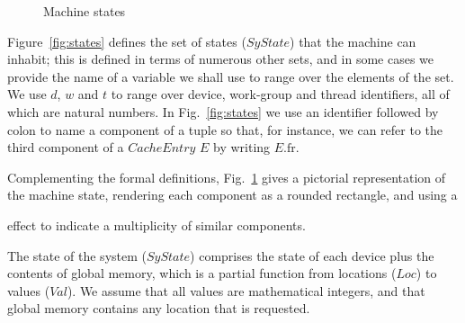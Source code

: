 \documentclass[svgnames,10pt]{sigplanconf}
\theoremstyle{definition}
\newcommand\var[1]{\mathit{#1}}
\begin{document}
\begin{figure}
{
\label{fig:states_pic}
}
\caption{Machine states}
\end{figure}

Figure~\ref{fig:states} defines the set of states ($\var{SyState}$) that
the machine can inhabit; this is defined in terms of numerous other
sets, and in some cases we provide the name of a variable we shall use
to range over the elements of the set. We use $d$, $w$ and $t$ to
range over device, work-group and thread identifiers, all of which are
natural numbers. In Fig.~\ref{fig:states} we use an identifier
followed by colon to name a component of a tuple so that, for
instance, we can refer to the third component of a $\var{CacheEntry}$
$E$ by writing $E.\mathrm{fr}$.

Complementing the formal definitions, Fig.~\ref{fig:states_pic}
gives a pictorial representation of the machine state, rendering each
component as a rounded rectangle, and using a 
effect to indicate a multiplicity of similar components.

The state of the system ($\var{SyState}$) comprises the state of each
device plus the contents of global memory, which is a partial function
from locations ($\var{Loc}$) to values ($\var{Val}$). We assume
that all values are mathematical integers, and that global memory
contains any location that is requested.
\end{document}
